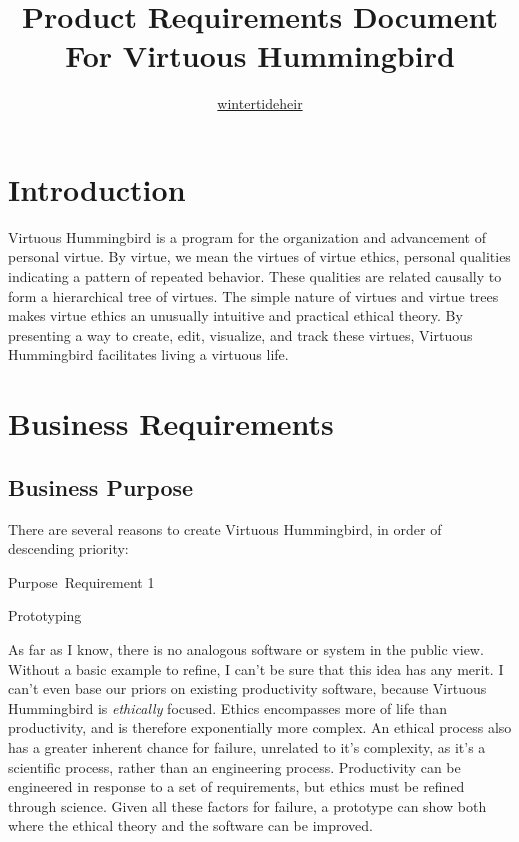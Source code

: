\documentclass{article}
\title{Product Requirements Document \\ \vspace{1mm} \normalsize For Virtuous Hummingbird}
\author{\href{https://github.com/wintertideheir}{wintertideheir}}
\date{}
\newcommand{\requirementname}{Undefined}
\newcommand{\requirementlabel}{undefined}
\newcommand{\setreqtype}[2]
    {
        \renewcommand{\requirementname}{#1}
        \renewcommand{\requirementlabel}{#2}
    }
\newenvironment{requirement}[2][]
    {
        \begin{mdframed}
        \label{\requirementlabel-#2}
        \vspace{2.5mm}
        \begin{center}
            {
                \large
                \requirementname\ Requirement #2
            
                #1
            }
        \end{center}
        \vspace{2.5mm}
    }
    {
        \end{mdframed}
    }
\begin{document}
\maketitle
\tableofcontents

\section{Introduction}

Virtuous Hummingbird is a program for the organization and advancement of personal virtue.
By virtue, we mean the virtues of virtue ethics, personal qualities indicating a pattern of repeated behavior.
These qualities are related causally to form a hierarchical tree of virtues. 
The simple nature of virtues and virtue trees makes virtue ethics an unusually intuitive and practical ethical theory.
By presenting a way to create, edit, visualize, and track these virtues, Virtuous Hummingbird facilitates living a virtuous life.

\section{Business Requirements}

\subsection{Business Purpose}
\setreqtype{Purpose}{purpose}

There are several reasons to create Virtuous Hummingbird, in order of descending priority:

\begin{requirement}[Prototyping]{1}
    As far as I know, there is no analogous software or system in the public view.
    Without a basic example to refine, I can't be sure that this idea has any merit.
    I can't even base our priors on existing productivity software, because Virtuous Hummingbird is \textit{ethically} focused.
    Ethics encompasses more of life than productivity, and is therefore exponentially more complex.
    An ethical process also has a greater inherent chance for failure, unrelated to it's complexity, as it's a scientific process, rather than an engineering process.
    Productivity can be engineered in response to a set of requirements, but ethics must be refined through science.
    Given all these factors for failure, a prototype can show both where the ethical theory and the software can be improved.
\end{requirement}
\end{document}
